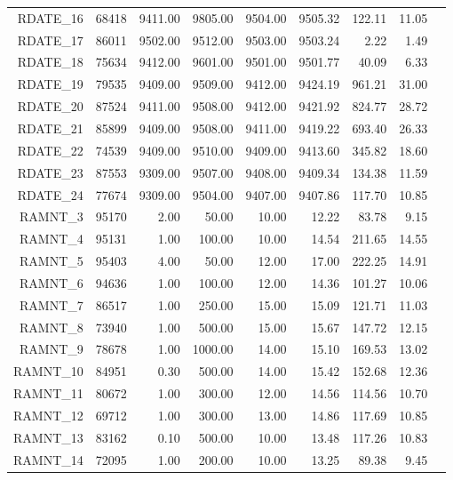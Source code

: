\begin{longtable}{|rrrrrrrrr|}
	RDATE\_16  &  68418  &  9411.00  &  9805.00  &  9504.00  &  9505.32  &  122.11  &  11.05 & \\
	RDATE\_17  &  86011  &  9502.00  &  9512.00  &  9503.00  &  9503.24  &  2.22  &  1.49 & \\
	RDATE\_18  &  75634  &  9412.00  &  9601.00  &  9501.00  &  9501.77  &  40.09  &  6.33 & \\
	RDATE\_19  &  79535  &  9409.00  &  9509.00  &  9412.00  &  9424.19  &  961.21  &  31.00 & \\
	RDATE\_20  &  87524  &  9411.00  &  9508.00  &  9412.00  &  9421.92  &  824.77  &  28.72 & \\
	RDATE\_21  &  85899  &  9409.00  &  9508.00  &  9411.00  &  9419.22  &  693.40  &  26.33 & \\
	RDATE\_22  &  74539  &  9409.00  &  9510.00  &  9409.00  &  9413.60  &  345.82  &  18.60 & \\
	RDATE\_23  &  87553  &  9309.00  &  9507.00  &  9408.00  &  9409.34  &  134.38  &  11.59 & \\
	RDATE\_24  &  77674  &  9309.00  &  9504.00  &  9407.00  &  9407.86  &  117.70  &  10.85 & \\
	RAMNT\_3  &  95170  &  2.00  &  50.00  &  10.00  &  12.22  &  83.78  &  9.15 & \\
	RAMNT\_4  &  95131  &  1.00  &  100.00  &  10.00  &  14.54  &  211.65  &  14.55 & \\
	RAMNT\_5  &  95403  &  4.00  &  50.00  &  12.00  &  17.00  &  222.25  &  14.91 & \\
	RAMNT\_6  &  94636  &  1.00  &  100.00  &  12.00  &  14.36  &  101.27  &  10.06 & \\
	RAMNT\_7  &  86517  &  1.00  &  250.00  &  15.00  &  15.09  &  121.71  &  11.03 & \\
	RAMNT\_8  &  73940  &  1.00  &  500.00  &  15.00  &  15.67  &  147.72  &  12.15 & \\
	RAMNT\_9  &  78678  &  1.00  &  1000.00  &  14.00  &  15.10  &  169.53  &  13.02 & \\
	RAMNT\_10  &  84951  &  0.30  &  500.00  &  14.00  &  15.42  &  152.68  &  12.36 & \\
	RAMNT\_11  &  80672  &  1.00  &  300.00  &  12.00  &  14.56  &  114.56  &  10.70 & \\
	RAMNT\_12  &  69712  &  1.00  &  300.00  &  13.00  &  14.86  &  117.69  &  10.85 & \\
	RAMNT\_13  &  83162  &  0.10  &  500.00  &  10.00  &  13.48  &  117.26  &  10.83 & \\
	RAMNT\_14  &  72095  &  1.00  &  200.00  &  10.00  &  13.25  &  89.38  &  9.45 & \\

\end{longtable}
